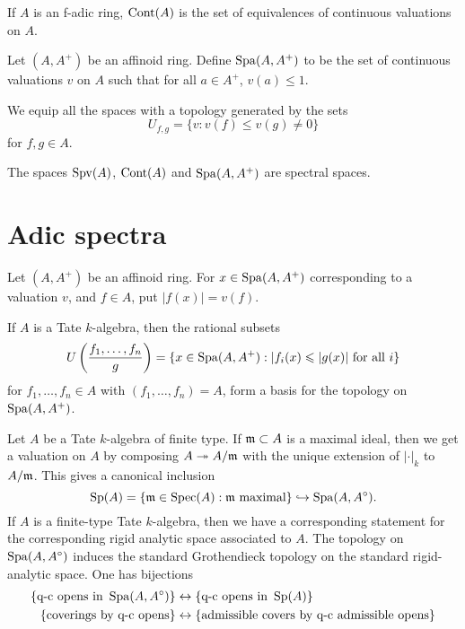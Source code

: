 \documentclass{article}
\begin{document}
\begin{definition}
If $A$ is an f-adic ring, $\operatorname{Cont}(A)$ is the set of equivalences of continuous 
valuations on $A$. 
\end{definition}

\begin{definition}
Let $(A,A^+)$ be an affinoid ring. Define $\operatorname{Spa}(A,A^+)$ to be the set of 
continuous valuations $v$ on $A$ such that for all $a\in A^+$, 
$v(a)\leqslant 1$. 
\end{definition}

We equip all the spaces with a topology generated by the sets 
\[
  U_{f,g} = \{v : v(f)\leqslant v(g)\ne 0\}
\]
for $f,g\in A$. 

\begin{theorem}
The spaces $\operatorname{Spv}(A)$, $\operatorname{Cont}(A)$ and $\operatorname{Spa}(A,A^+)$ are spectral spaces. 
\end{theorem}





\section{Adic spectra}

Let $(A,A^+)$ be an affinoid ring. For $x\in \operatorname{Spa}(A,A^+)$ corresponding to a 
valuation $v$, and $f\in A$, put $|f(x)| = v(f)$. 

If $A$ is a Tate $k$-algebra, then the rational subsets 
\[
  U\left(\frac{f_1,\dots,f_n}{g}\right) = \{x\in \operatorname{Spa}(A,A^+):|f_i(x)\leqslant |g(x)|\text{ for all }i\}
\]
for $f_1,\dots,f_n\in A$ with $(f_1,\dots,f_n) = A$, form a basis for the 
topology on $\operatorname{Spa}(A,A^+)$. 

\begin{example}
Let $A$ be a Tate $k$-algebra of finite type. If $\mathfrak{m}\subset A$ is a maximal 
ideal, then we get a valuation on $A$ by composing $A\twoheadrightarrow A/\mathfrak{m}$ 
with the unique extension of $|\cdot |_k$ to $A/\mathfrak{m}$. This gives a canonical 
inclusion 
\[
  \operatorname{Sp}(A)=\{\mathfrak{m}\in\operatorname{Spec}(A):\mathfrak{m}\text{ maximal}\}\hookrightarrow \operatorname{Spa}(A,A^\circ) .
\]
If $A$ is a finite-type Tate $k$-algebra, then we have a corresponding statement 
for the corresponding rigid analytic space associated to $A$. The topology on 
$\operatorname{Spa}(A,A^\circ)$ induces the standard Grothendieck topology on the standard 
rigid-analytic space. One has bijections  
\begin{align*}
  \{\text{q-c opens in }\operatorname{Spa}(A,A^\circ)\} 
    &\leftrightarrow \{\text{q-c opens in }\operatorname{Sp}(A)\} \\
  \{\text{coverings by q-c opens}\} 
    &\leftrightarrow\{\text{admissible covers by q-c admissible opens}\}
\end{align*}
\end{example}
\end{document}

